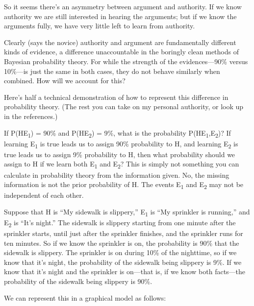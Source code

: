 {
 So it seems there's an asymmetry between argument
and authority. If we know authority we are still interested in hearing
the arguments; but if we know the arguments fully, we have very little
left to learn from authority.}

{
 Clearly (says the novice) authority and argument are fundamentally
different kinds of evidence, a difference unaccountable in the boringly
clean methods of Bayesian probability theory. For while the strength of
the evidences---90\% versus 10\%---is just the same in both cases, they
do not behave similarly when combined. How will we account for this?}

{
 Here's half a technical demonstration of how to
represent this difference in probability theory. (The rest you can take
on my personal authority, or look up in the references.)}

{
 If P(H{\textbar}E\textsubscript{1}) = 90\% and
P(H{\textbar}E\textsubscript{2}) = 9\%, what is the probability
P(H{\textbar}E\textsubscript{1},E\textsubscript{2})? If learning
E\textsubscript{1} is true leads us to assign 90\% probability to H,
and learning E\textsubscript{2} is true leads us to assign 9\%
probability to H, then what probability should we assign to H if we
learn both E\textsubscript{1} and E\textsubscript{2}? This is simply
not something you can calculate in probability theory from the
information given. No, the missing information is not the prior
probability of H. The events E\textsubscript{1} and E\textsubscript{2}
may not be independent of each other.}

{
 Suppose that H is ``My sidewalk is
slippery,'' E\textsubscript{1} is
``My sprinkler is running,'' and
E\textsubscript{2} is ``It's
night.'' The sidewalk is slippery starting from one
minute after the sprinkler starts, until just after the sprinkler
finishes, and the sprinkler runs for ten minutes. So if we know the
sprinkler is on, the probability is 90\% that the sidewalk is slippery.
The sprinkler is on during 10\% of the nighttime, so if we know that
it's night, the probability of the sidewalk being
slippery is 9\%. If we know that it's night and the
sprinkler is on---that is, if we know both facts---the probability of
the sidewalk being slippery is 90\%.}

{
 We can represent this in a graphical model as follows:}

{
 ~}



{
 ~}

